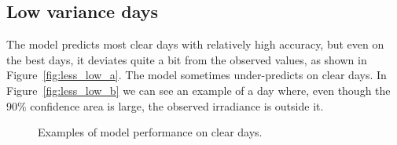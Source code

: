 \subsection{Low variance days}
The model predicts most clear days with relatively high accuracy, but even on the best days, it deviates quite a bit from the observed values, as shown in Figure~\ref{fig:less_low_a}. The model sometimes under-predicts on clear days. In Figure~\ref{fig:less_low_b} we can see an example of a day where, even though the 90\% confidence area is large, the observed irradiance is outside it.
\begin{figure}[ht!]
    \centering
    \qquad
    \qquad
    \caption{Examples of model performance on clear days.
    \label{fig:less_low}}
\end{figure}

